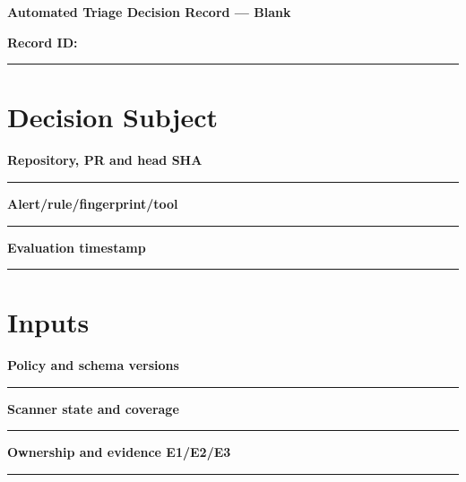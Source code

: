\documentclass[11pt,letterpaper]{article}
\begin{document}
\begin{center}{\LARGE\bfseries Automated Triage Decision Record --- Blank}\par
\vspace{4pt}{\small Print-ready unfilled assessment instrument}\par
\end{center}
\noindent\textbf{Record ID:} \rule{2.6in}{0.4pt}\par
\section{Decision Subject}
\noindent\textbf{Repository, PR and head SHA}\par
\vspace{1.1em}\noindent\rule{0.96\linewidth}{0.4pt}\par\vspace{0.65em}
\noindent\textbf{Alert/rule/fingerprint/tool}\par
\vspace{1.1em}\noindent\rule{0.96\linewidth}{0.4pt}\par\vspace{0.65em}
\noindent\textbf{Evaluation timestamp}\par
\vspace{1.1em}\noindent\rule{0.96\linewidth}{0.4pt}\par\vspace{0.65em}
\section{Inputs}
\noindent\textbf{Policy and schema versions}\par
\vspace{1.1em}\noindent\rule{0.96\linewidth}{0.4pt}\par\vspace{0.65em}
\noindent\textbf{Scanner state and coverage}\par
\vspace{1.1em}\noindent\rule{0.96\linewidth}{0.4pt}\par\vspace{0.65em}
\noindent\textbf{Ownership and evidence E1/E2/E3}\par
\vspace{1.1em}\noindent\rule{0.96\linewidth}{0.4pt}\par\vspace{0.65em}
\end{document}
